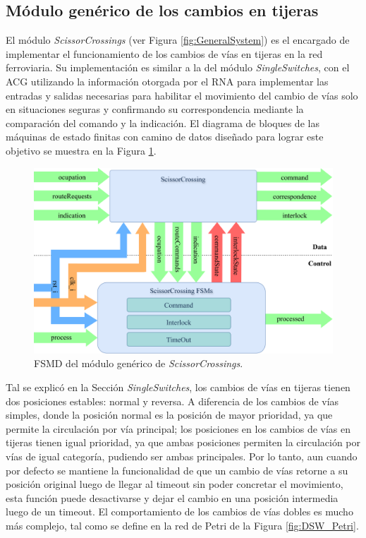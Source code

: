\subsection{Módulo genérico de los cambios en tijeras}
	\label{sec:ACG_scr}
		
	El módulo \textit{ScissorCrossings} (ver Figura \ref{fig:GeneralSystem}) es el encargado de implementar el funcionamiento de los cambios de vías en tijeras en la red ferroviaria. Su implementación es similar a la del módulo \textit{SingleSwitches}, con el ACG utilizando la información otorgada por el RNA para implementar las entradas y salidas necesarias para habilitar el movimiento del cambio de vías solo en situaciones seguras y confirmando su correspondencia mediante la comparación del comando y la indicación. El diagrama de bloques de las máquinas de estado finitas con camino de datos diseñado para lograr este objetivo se muestra en la Figura \ref{fig:SCR_module}.
	
	\begin{figure}[H]
		\centering
		\includegraphics[width=1\textwidth]{Figuras/SCR_module}
		\centering\caption{FSMD del módulo genérico de \textit{ScissorCrossings}.}
		\label{fig:SCR_module}
	\end{figure}
	
	Tal se explicó en la Sección \textit{SingleSwitches}, los cambios de vías en tijeras tienen dos posiciones estables: normal y reversa. A diferencia de los cambios de vías simples, donde la posición normal es la posición de mayor prioridad, ya que permite la circulación por vía principal; los posiciones en los cambios de vías en tijeras tienen igual prioridad, ya que ambas posiciones permiten la circulación por vías de igual categoría, pudiendo ser ambas principales. Por lo tanto, aun cuando por defecto se mantiene la funcionalidad de que un cambio de vías retorne a su posición original luego de llegar al timeout sin poder concretar el movimiento, esta función puede desactivarse y dejar el cambio en una posición intermedia luego de un timeout. El comportamiento de los cambios de vías dobles es mucho más complejo, tal como se define en la red de Petri de la Figura \ref{fig:DSW_Petri}.
	
